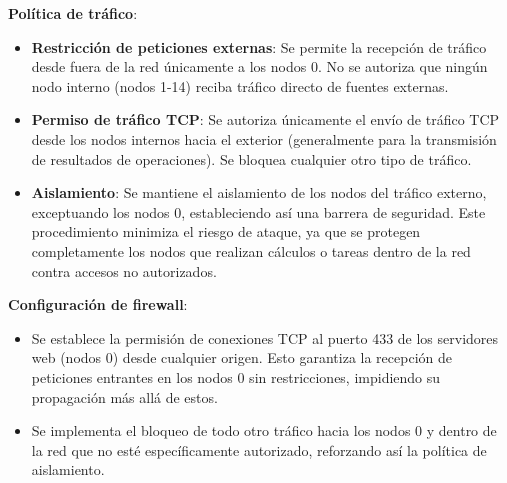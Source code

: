 \documentclass[%
    school=etsisi,%
    degree=61TI,%
]{upm-report}
\begin{document}
\textbf{Política de tráfico}:
\begin{itemize}
    \item \textbf{Restricción de peticiones externas}: Se permite la recepción de tráfico desde fuera de la red únicamente a los nodos 0. No se autoriza que ningún nodo interno (nodos 1-14) reciba tráfico directo de fuentes externas.
    \item \textbf{Permiso de tráfico TCP}: Se autoriza únicamente el envío de tráfico TCP desde los nodos internos hacia el exterior (generalmente para la transmisión de resultados de operaciones). Se bloquea cualquier otro tipo de tráfico.
    \item \textbf{Aislamiento}: Se mantiene el aislamiento de los nodos del tráfico externo, exceptuando los nodos 0, estableciendo así una barrera de seguridad. Este procedimiento minimiza el riesgo de ataque, ya que se protegen completamente los nodos que realizan cálculos o tareas dentro de la red contra accesos no autorizados.
\end{itemize}

\textbf{Configuración de firewall}:
\begin{itemize}
    \item Se establece la permisión de conexiones TCP al puerto 433 de los servidores web (nodos 0) desde cualquier origen. Esto garantiza la recepción de peticiones entrantes en los nodos 0 sin restricciones, impidiendo su propagación más allá de estos.
    \item Se implementa el bloqueo de todo otro tráfico hacia los nodos 0 y dentro de la red que no esté específicamente autorizado, reforzando así la política de aislamiento.
\end{itemize}
\end{document}
